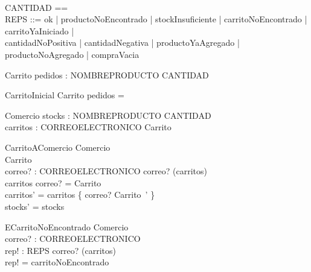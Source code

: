 \documentclass[11pt]{article}
\begin{document}

\begin{zed}
   \\
  CANTIDAD == \nat \\
  REPS ::= ok | productoNoEncontrado | stockInsuficiente | carritoNoEncontrado | carritoYaIniciado | \\
  cantidadNoPositiva | cantidadNegativa | productoYaAgregado | productoNoAgregado | compraVacia
\end{zed}

\begin{schema}{Carrito}
  pedidos : NOMBREPRODUCTO \pfun CANTIDAD
\end{schema}
  
\begin{schema}{CarritoInicial}
Carrito
\where
pedidos = \emptyset
\end{schema}

\begin{schema}{Comercio}
stocks : NOMBREPRODUCTO \pfun CANTIDAD \\
carritos : CORREOELECTRONICO \pfun Carrito
\end{schema}



\begin{schema}{CarritoAComercio}
\Delta Comercio \\
\Delta Carrito \\
correo? : CORREOELECTRONICO
\where
correo? \in (\dom carritos) \\
carritos \; correo? = \theta Carrito \\
carritos' = carritos \oplus \{ correo? \mapsto \theta Carrito\ ' \} \\
stocks' = stocks
\end{schema}

\begin{schema}{ECarritoNoEncontrado}
\Xi Comercio \\
correo? : CORREOELECTRONICO \\
rep! : REPS
\where
correo? \notin (\dom carritos) \\
rep! = carritoNoEncontrado
\end{schema}
\end{document}
